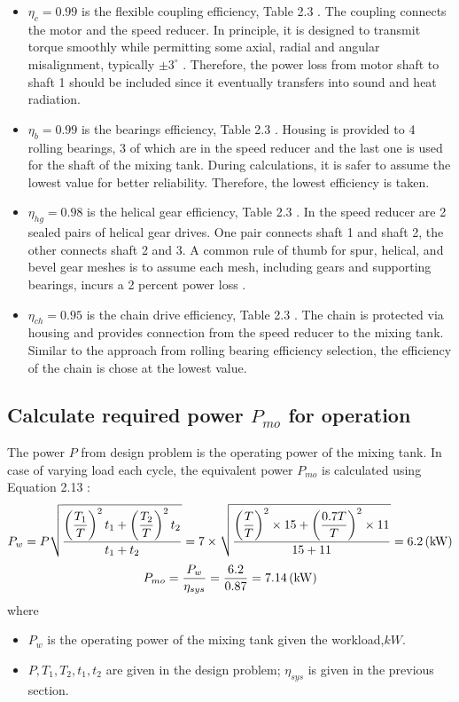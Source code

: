 \begin{itemize}
	\item $ \eta_c = 0.99 $ is the flexible coupling efficiency, Table 2.3 \cite{tk1}. The  coupling connects the motor and the speed reducer. In principle, it is designed to transmit torque smoothly while permitting some axial, radial and angular misalignment, typically $ \pm 3^\circ $ \cite{mott_vavrek_wang_2018}. Therefore, the power loss from motor shaft to shaft 1 should be included since it eventually transfers into sound and heat radiation.
	\item $ \eta_b = 0.99 $ is the bearings efficiency, Table 2.3 \cite{tk1}. Housing is provided to 4 rolling bearings, 3 of which are in the speed reducer and the last one is used for the shaft of the mixing tank. During calculations, it is safer to assume the lowest  value for better reliability. Therefore, the lowest efficiency is taken.
	\item $ \eta_{hg} = 0.98 $ is the helical gear efficiency, Table 2.3 \cite{tk1}. In the speed reducer are 2 sealed pairs of helical gear drives. One pair connects shaft 1 and shaft 2, the other connects shaft 2 and 3. A common rule of thumb for spur, helical, and bevel gear meshes is to assume each mesh, including gears and supporting bearings, incurs a 2 percent power loss \cite{collins_busby_staab_2010}.
	\item $ \eta_{ch} = 0.95 $ is the chain drive efficiency, Table 2.3 \cite{tk1}. The chain is protected via housing and provides connection from  the speed reducer to the mixing tank. Similar to the approach from rolling bearing efficiency selection, the efficiency of the chain is chose at the lowest value.
\end{itemize}
\subsection{Calculate required power $ P_{mo} $ for operation} The power $ P $ from design problem is the operating power of the mixing tank. In case of varying load each cycle, the equivalent power $ P_{mo} $ is calculated using  Equation 2.13 \cite{tk1}:
\[P_w = P\sqrt{\dfrac{\left(\dfrac{T_1}{T}\right)^2t_1 + \left(\dfrac{T_2}{T}\right)^2t_2}{t_1+t_2}} = 7 \times \sqrt{\dfrac{\left(\dfrac{T}{T}\right)^2\times15 + \left(\dfrac{0.7T}{T}\right)^2\times11}{15+11}} = 6.2 \, (\mathrm{kW})\]
\[P_{mo} = \dfrac{P_w}{\eta_{sys}} = \dfrac{6.2}{0.87} = 7.14 \, (\mathrm{kW})\]
where
\begin{itemize}
	\item $ P_w $ is the operating power of the mixing tank given the workload,$ \unit{kW} $.
	\item $ P,T_1,T_2,t_1,t_2$ are given in the design problem; $ \eta_{sys} $ is given in the previous section.
\end{itemize}

